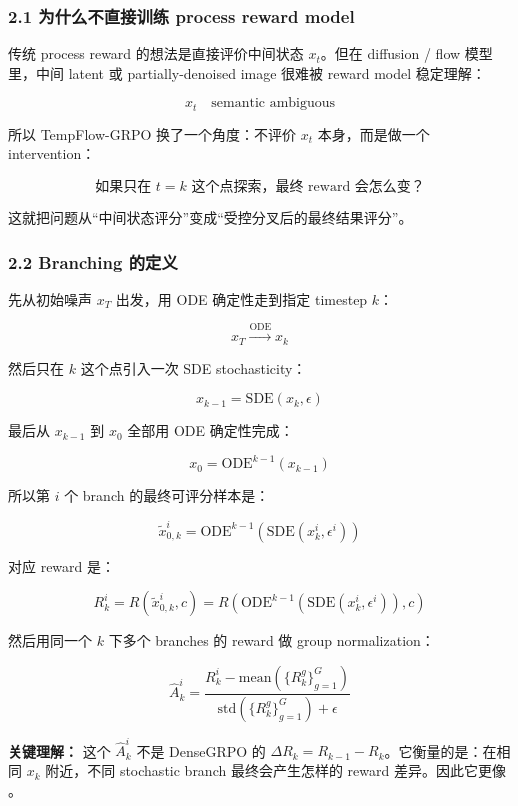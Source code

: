 \subsubsection{2.1 为什么不直接训练 process reward model}

传统 process reward 的想法是直接评价中间状态 \(x_t\)。但在 diffusion / flow 模型里，中间 latent 或 partially-denoised image 很难被 reward model 稳定理解：

\[
x_t \quad \text{semantic ambiguous}
\]

所以 TempFlow-GRPO 换了一个角度：不评价 \(x_t\) 本身，而是做一个 intervention：

\[
\text{如果只在 } t=k \text{ 这个点探索，最终 reward 会怎么变？}
\]

这就把问题从“中间状态评分”变成“受控分叉后的最终结果评分”。

\subsubsection{2.2 Branching 的定义}

先从初始噪声 \(x_T\) 出发，用 ODE 确定性走到指定 timestep \(k\)：

\[
x_T \xrightarrow{\mathrm{ODE}} x_k
\]

然后只在 \(k\) 这个点引入一次 SDE stochasticity：

\[
x_{k-1}
=
\mathrm{SDE}(x_k,\epsilon)
\]

最后从 \(x_{k-1}\) 到 \(x_0\) 全部用 ODE 确定性完成：

\[
x_0
=
\mathrm{ODE}^{k-1}(x_{k-1})
\]

所以第 \(i\) 个 branch 的最终可评分样本是：

\[
\tilde{x}_{0,k}^i
=
\mathrm{ODE}^{k-1}
\left(
\mathrm{SDE}(x_k^i,\epsilon^i)
\right)
\]

对应 reward 是：

\[
R_k^i
=
R(\tilde{x}_{0,k}^i,c)
=
R\left(
\mathrm{ODE}^{k-1}
\left(
\mathrm{SDE}(x_k^i,\epsilon^i)
\right),
c
\right)
\]

然后用同一个 \(k\) 下多个 branches 的 reward 做 group normalization：

\[
\hat{A}_k^i
=
\frac{
R_k^i-\mathrm{mean}(\{R_k^g\}_{g=1}^{G})
}{
\mathrm{std}(\{R_k^g\}_{g=1}^{G})+\epsilon
}
\]

\begin{summarybox}
\textbf{关键理解：} 这个 \(\hat{A}_k^i\) 不是 DenseGRPO 的 \(\Delta R_k=R_{k-1}-R_k\)。它衡量的是：在相同 \(x_k\) 附近，不同 stochastic branch 最终会产生怎样的 reward 差异。因此它更像 。
\end{summarybox}

